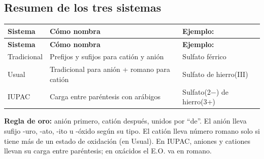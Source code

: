 \subsection*{\textcolor{blueunam}{Resumen de los tres sistemas}}

\begin{longtable}{L{2.4cm} L{4.6cm} L{4.8cm}}
\toprule
\textbf{Sistema} & \textbf{Cómo nombra} & \textbf{Ejemplo: } \\
\midrule\endfirsthead\toprule
\textbf{Sistema} & \textbf{Cómo nombra} & \textbf{Ejemplo: } \\
\midrule\endhead\bottomrule\endlastfoot
Tradicional & Prefijos y sufijos para catión y anión      & Sulfato férrico \\
Usual       & Tradicional para anión + romano para catión  & Sulfato de hierro(III) \\
IUPAC       & Carga entre paréntesis con arábigos          & Sulfato(2$-$) de hierro(3+) \\
\bottomrule
\end{longtable}

\textbf{Regla de oro:} anión primero, catión después, unidos por ``de''. El anión lleva sufijo -uro, -ato, -ito u -óxido según su tipo. El catión lleva número romano solo si tiene más de un estado de oxidación (en Usual). En IUPAC, aniones y cationes llevan su carga entre paréntesis; en oxácidos el E.O. va en romano.